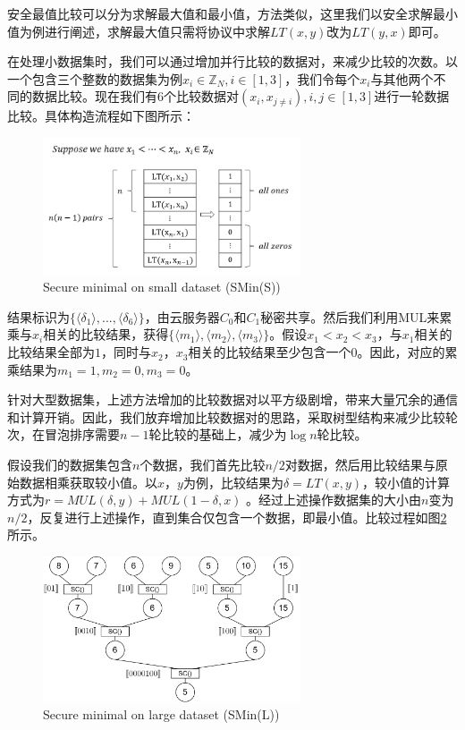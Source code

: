 安全最值比较可以分为求解最大值和最小值，方法类似，这里我们以安全求解最小值为例进行阐述，求解最大值只需将协议中求解$LT(x,y)$改为$LT(y,x)$即可。

在处理小数据集时，我们可以通过增加并行比较的数据对，来减少比较的次数。以一个包含三个整数的数据集为例$x_i \in \mathbb{Z}_N, i\in[1,3]$，我们令每个$x_i$与其他两个不同的数据比较。现在我们有6个比较数据对$(x_i, x_{j\neq i}), i,j \in [1,3] $进行一轮数据比较。具体构造流程如下图所示：

\begin{figure}[htbp]
    \centering
    \includegraphics[width=3in]{img/fig4.png}%
    \caption{Secure minimal on small dataset (SMin(S))}
    \label{smins}
\end{figure}

结果标识为$\{\langle\delta_1\rangle,...,\langle\delta_6\rangle\}$，由云服务器$C_0$和$C_1$秘密共享。然后我们利用MUL来累乘与$x_i$相关的比较结果，获得$\{\langle m_1 \rangle,\langle m_2 \rangle,\langle m_3\rangle\}$。假设$x_1<x_2<x_3$，与$x_1$相关的比较结果全部为$1$，同时与$x_2$，$x_3$相关的比较结果至少包含一个$0$。因此，对应的累乘结果为$m_1=1, m_2=0, m_3=0$。

针对大型数据集，上述方法增加的比较数据对以平方级剧增，带来大量冗余的通信和计算开销。因此，我们放弃增加比较数据对的思路，采取树型结构来减少比较轮次，在冒泡排序需要$n-1$轮比较的基础上，减少为$\log n$轮比较。

假设我们的数据集包含$n$个数据，我们首先比较$n/2$对数据，然后用比较结果与原始数据相乘获取较小值。以$x$，$y$为例，比较结果为$\delta = LT(x,y) $，较小值的计算方式为$r=MUL(\delta, y) + MUL(1-\delta, x)$ 。经过上述操作数据集的大小由$n$变为$n/2$，反复进行上述操作，直到集合仅包含一个数据，即最小值。比较过程如图\ref{sminl}所示。

\begin{figure}[htbp]
    \centering
    \includegraphics[width=3in]{img/fig1.png}%
    \caption{Secure minimal on large dataset (SMin(L))}
    \label{sminl}
\end{figure}

